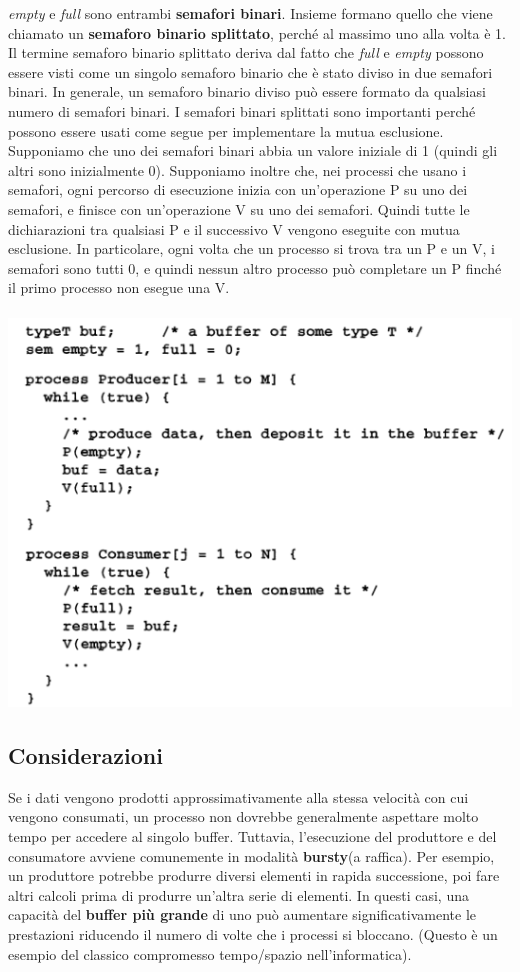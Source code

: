 \documentclass[10pt,a4paper]{book}
\begin{document}
\textit{empty} e \textit{full} sono entrambi \textbf{semafori binari}. Insieme
formano quello che viene chiamato un \textbf{semaforo binario splittato}, perché al massimo uno alla volta è 1. Il termine semaforo binario splittato deriva dal fatto che \textit{full} e \textit{empty} possono essere visti come un singolo semaforo binario che è stato diviso in due semafori binari. In generale, un semaforo binario diviso può essere formato da qualsiasi numero di semafori binari.
I semafori binari splittati sono importanti perché possono essere usati come segue per implementare la mutua esclusione. Supponiamo che uno dei semafori binari abbia un valore iniziale di 1 (quindi gli altri sono inizialmente 0). Supponiamo inoltre che, nei processi che usano i semafori, ogni percorso di esecuzione inizia con un'operazione P su uno dei semafori, e finisce con un'operazione V su uno dei semafori.
Quindi tutte le dichiarazioni tra qualsiasi P e il successivo V vengono eseguite con mutua esclusione.
In particolare, ogni volta che un processo si trova tra un P e un V, i semafori sono tutti 0, e quindi nessun altro processo può completare un P finché il primo processo non esegue una V.\\ \\
\includegraphics[scale=0.7]{img/split.png} \\

\subsection{Considerazioni} Se i dati vengono prodotti approssimativamente alla stessa velocità con cui vengono consumati, un processo non dovrebbe generalmente aspettare molto tempo per accedere al singolo buffer. Tuttavia, l'esecuzione del produttore e del consumatore avviene comunemente in modalità \textbf{bursty}(a raffica).
Per esempio, un produttore potrebbe produrre diversi elementi in rapida successione, poi fare altri calcoli prima di produrre un'altra serie di elementi. In questi casi, una capacità del \textbf{buffer più grande} di uno può aumentare significativamente le prestazioni riducendo il numero di volte che i processi si bloccano. (Questo è un esempio del classico compromesso tempo/spazio nell'informatica).
\end{document}
